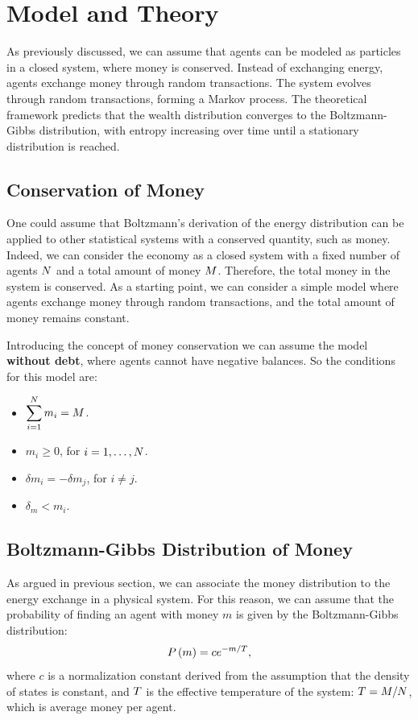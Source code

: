 
\section{Model and Theory}
As previously discussed, we can assume that agents can be modeled as particles in a closed system, where money is conserved.
Instead of exchanging energy, agents exchange money through random transactions. 
The system evolves through random transactions, forming a Markov process. 
The theoretical framework predicts that the wealth distribution converges to the Boltzmann-Gibbs distribution, with entropy increasing over time until a stationary distribution is reached.

\subsection{Conservation of Money}
One could assume that Boltzmann's derivation of the energy distribution can be applied to other statistical systems with a conserved quantity, such as money.
Indeed, we can consider the economy as a closed system with a fixed number of agents $N$ and a total amount of money $M$.
Therefore, the total money in the system is conserved.
As a starting point, we can consider a simple model where agents exchange money through random transactions, and the total amount of money remains constant.

Introducing the concept of money conservation we can assume the model \textbf{without debt}, where agents cannot have negative balances.
So the conditions for this model are:
\begin{itemize}
    \item $\displaystyle \sum_{i=1}^{N} m_i = M$.
    \item $m_i \geq 0$, for $i = 1, \ldots, N$.
    \item $\delta m_i = -\delta m_j$, for $i \neq j$.
    \item $\delta_m < m_i$.
\end{itemize}

\subsection{Boltzmann-Gibbs Distribution of Money}
As argued in previous section, we can associate the money distribution
to the energy exchange in a physical system. 
For this reason, we can assume that the probability of finding an agent with money $m$ is given by the Boltzmann-Gibbs distribution:
\begin{equation}
    P\left(m\right) = c e^{-m/T},
\label{eq:boltzmann-gibbs}
\end{equation}
where $c$ is a normalization constant derived from the assumption that the density of states is constant, and $T$ is the effective temperature of the system: $T = M / N$, which is average money per agent.


